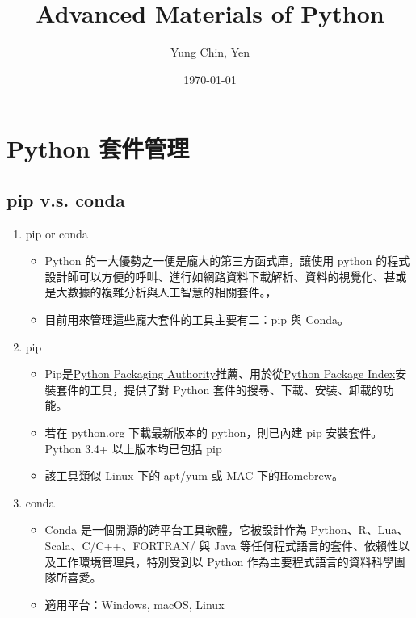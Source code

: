 \documentclass[a4paper,12pt]{article}
\author{Yung Chin, Yen}
\date{\today}
\title{Advanced Materials of Python}
\begin{document}
\maketitle
\tableofcontents

\newpage
\section{Python 套件管理}
\label{sec:org454d0d3}
\subsection{pip v.s. conda}
\label{sec:org717bf1a}
\begin{enumerate}
\item pip or conda
\label{sec:orgde55b26}
\begin{itemize}
\item Python 的一大優勢之一便是龐大的第三方函式庫，讓使用 python 的程式設計師可以方便的呼叫、進行如網路資料下載解析、資料的視覺化、甚或是大數據的複雜分析與人工智慧的相關套件。，\\
\item 目前用來管理這些龐大套件的工具主要有二：pip 與 Conda。\\
\end{itemize}
\item pip
\label{sec:org35ab7a8}
\begin{itemize}
\item Pip是\href{https://www.pypa.io/en/latest/}{Python Packaging Authority}推薦、用於從\href{https://pypi.org/}{Python Package Index}安裝套件的工具，提供了對 Python 套件的搜㝷、下載、安裝、卸載的功能。\\
\item 若在 python.org 下載最新版本的 python，則已內建 pip 安裝套件。 Python 3.4+ 以上版本均已包括 pip\\
\item 該工具類似 Linux 下的 apt/yum 或 MAC 下的\href{https://brew.sh/index\_zh-tw}{Homebrew}。\\
\end{itemize}
\item conda
\label{sec:org368730d}
\begin{itemize}
\item Conda 是一個開源的跨平台工具軟體，它被設計作為 Python、R、Lua、Scala、C/C++、FORTRAN/ 與 Java 等任何程式語言的套件、依賴性以及工作環境管理員，特別受到以 Python 作為主要程式語言的資料科學團隊所喜愛。\\
\item 適用平台：Windows, macOS, Linux\\

\end{itemize}
\end{enumerate}
\end{document}
